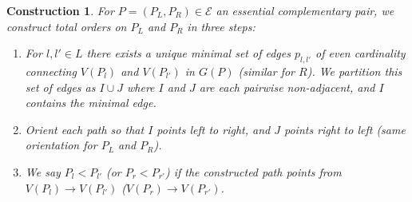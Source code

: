 \documentclass[11pt]{amsart}
\newtheorem{construction}[thm]{Construction}
\theoremstyle{definition}
\theoremstyle{remark}
\numberwithin{equation}{section}
\newcommand{\EC}{\mathcal{E}} %
\newcommand{\0}{\color{blue}{\mathsf{0}}}
\begin{document}
\begin{construction} 
\label{Order Lemma}
For $P=(P_L,P_R) \in \EC$ an essential complementary pair, we construct total orders on $P_L$ and $P_R$ in three steps:
\begin{enumerate}
    \item For $l,l' \in L$ there exists a unique minimal set of edges $p_{l,l'}$ of even cardinality connecting $V(P_l)$ and $V(P_{l'})$ in $G(P)$ (similar for $R$). We partition this set of edges as $I\cup J$ where $I$ and $J$ are each pairwise non-adjacent, and $I$ contains the minimal edge.
    \item Orient each path so that $I$ points left to right, and $J$ points right to left (same orientation for $P_L$ and $P_R$). 
    \item We say $P_l< P_{l'}$ (or $P_r < P_{r'}$) if the constructed path points from $V(P_l) \to V(P_{l'})$ ($V(P_r) \to V(P_{r'})$.
\end{enumerate}
\end{construction}
\end{document}
